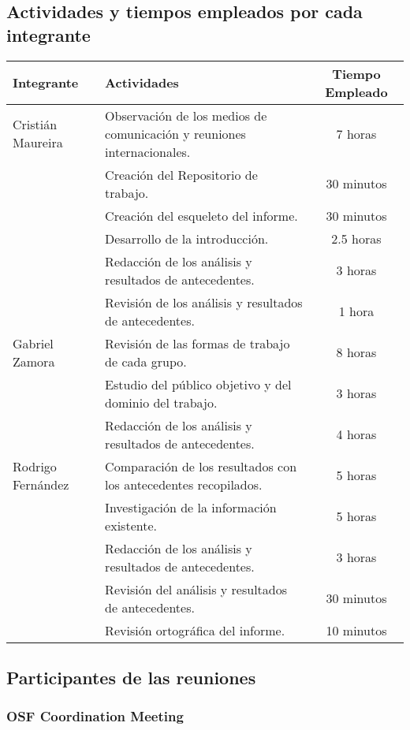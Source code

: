 \subsection{Actividades y tiempos empleados por cada integrante}

\begin{tabular}{|l|p{7cm}|c|}
\hline
Integrante & Actividades & Tiempo Empleado \\\hline
Cristián Maureira & Observación de los medios de comunicación y reuniones internacionales. & 7 horas \\
& Creación del Repositorio de trabajo. & 30 minutos \\
& Creación del esqueleto del informe.& 30 minutos \\
& Desarrollo de la introducción. & 2.5 horas \\
& Redacción de los análisis y resultados de antecedentes. & 3 horas \\
& Revisión de los análisis y resultados de antecedentes. & 1 hora \\
\hline
Gabriel Zamora & Revisión de  las formas de trabajo de cada grupo. & 8 horas \\
& Estudio del público objetivo y del dominio del trabajo. & 3 horas \\
& Redacción de los análisis y resultados de antecedentes. & 4 horas \\
\hline
Rodrigo Fernández & Comparación de los resultados con los antecedentes
recopilados. & 5 horas \\
& Investigación de la información existente. & 5 horas \\
& Redacción de los análisis y resultados de antecedentes. & 3 horas \\
& Revisión del análisis y resultados de antecedentes. & 30 minutos \\
& Revisión ortográfica del informe. & 10 minutos \\
\hline
\end{tabular}
\newpage
\subsection{Participantes de las reuniones}
\subsubsection{OSF Coordination Meeting}

